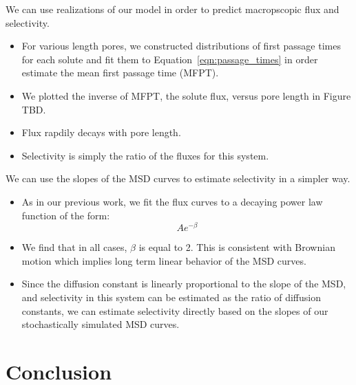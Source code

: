 \documentclass{article}
\begin{document}
  
  We can use realizations of our model in order to predict macropscopic flux and
  selectivity.
  \begin{itemize}
    \item For various length pores, we constructed distributions of first passage times for each solute and
    fit them to Equation~\ref{eqn:passage_times} in order estimate the mean 
    first passage time (MFPT). 
    \item We plotted the inverse of MFPT, the solute flux, versus pore length
    in Figure TBD.
    \item Flux rapdily decays with pore length.
    \item Selectivity is simply the ratio of the fluxes for this system.
  \end{itemize}

  We can use the slopes of the MSD curves to estimate selectivity in a simpler way.
  \begin{itemize}
  	\item As in our previous work, we fit the flux curves to a decaying power law function
  	of the form:
  	\begin{equation}
    	Ae^{-\beta}
  	\end{equation}
  	\item We find that in all cases, $\beta$ is equal to 2. This is consistent with Brownian
	motion which implies long term linear behavior of the MSD curves. 
	\item Since the diffusion constant is linearly proportional to the slope of the MSD, and 
	selectivity in this system can be estimated as the ratio of diffusion constants, we can 
	estimate selectivity directly based on the slopes of our stochastically simulated MSD curves.
  \end{itemize}
  
  \section{Conclusion}
  
\end{document}
